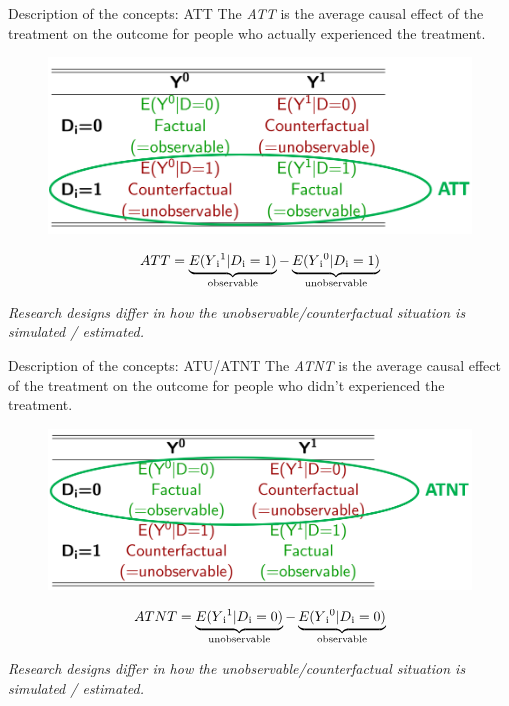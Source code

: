 \documentclass{beamer}\usepackage[]{graphicx}\usepackage[]{color}
\begin{document}
\begin{frame}{Description of the concepts: ATT}
The \textit{ATT} is the average causal effect of the treatment on the outcome for people who actually experienced the treatment.
\begin{figure}
\centering
\includegraphics[width=1\textwidth]{Graphics/ATT.png}
\end{figure}
\begin{equation}
ATT = \underbrace{E(Y\textsubscript{i}\textsuperscript{1} \vert D\textsubscript{i}=1)}_\text{observable} - \underbrace{E(Y\textsubscript{i}\textsuperscript{0} \vert D\textsubscript{i}=1)}_\text{unobservable}
\end{equation} 

\small\textit{Research designs differ in how the unobservable/counterfactual situation is simulated / estimated.}
\end{frame}


\begin{frame}{Description of the concepts: ATU/ATNT}
The \textit{ATNT} is the average causal effect of the treatment on the outcome for people who didn't experienced the treatment.
\begin{figure}
\centering
\includegraphics[width=1\textwidth]{Graphics/ATNT.png}
\end{figure}
\begin{equation}
ATNT = \underbrace{E(Y\textsubscript{i}\textsuperscript{1} \vert D\textsubscript{i}=0)}_\text{unobservable} - \underbrace{E(Y\textsubscript{i}\textsuperscript{0} \vert D\textsubscript{i}=0)}_\text{observable}
\end{equation} 

\small\textit{Research designs differ in how the unobservable/counterfactual situation is simulated / estimated.}
\end{frame}
\end{document}
